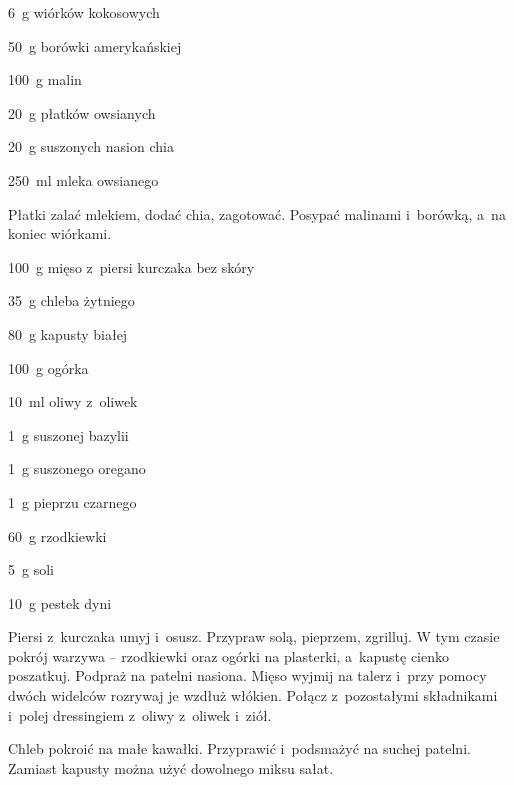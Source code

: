 \documentclass[../kucharek.tex]{subfiles}
\begin{document}

\begin{Ingred}
    \item \qty{6}{\gram} wiórków kokosowych
    \item \qty{50}{\gram} borówki amerykańskiej
    \item \qty{100}{\gram} malin
    \item \qty{20}{\gram} płatków owsianych
    \item \qty{20}{\gram} suszonych nasion chia
    \item \qty{250}{\milli\litre} mleka owsianego
\end{Ingred}

Płatki zalać mlekiem, dodać chia, zagotować. Posypać malinami i~borówką, a~na
koniec wiórkami.


\begin{Ingred}
    \item \qty{100}{\gram} mięso z~piersi kurczaka bez skóry
    \item \qty{35}{\gram} chleba żytniego
    \item \qty{80}{\gram} kapusty białej
    \item \qty{100}{\gram} ogórka
    \item \qty{10}{\milli\litre} oliwy z~oliwek
    \item \qty{1}{\gram} suszonej bazylii
    \item \qty{1}{\gram} suszonego oregano
    \item \qty{1}{\gram} pieprzu czarnego
    \item \qty{60}{\gram} rzodkiewki
    \item \qty{5}{\gram} soli
    \item \qty{10}{\gram} pestek dyni
\end{Ingred}

Piersi z~kurczaka umyj i~osusz. Przypraw solą, pieprzem, zgrilluj. W tym czasie
pokrój warzywa -- rzodkiewki oraz ogórki na plasterki, a~kapustę cienko
poszatkuj. Podpraż na patelni nasiona. Mięso wyjmij na talerz i~przy pomocy
dwóch widelców rozrywaj je wzdłuż włókien. Połącz z~pozostałymi składnikami
i~polej dressingiem z~oliwy z~oliwek i~ziół.

Chleb pokroić na małe kawałki. Przyprawić i~podsmażyć na suchej patelni.
Zamiast kapusty można użyć dowolnego miksu sałat.

\end{document}
